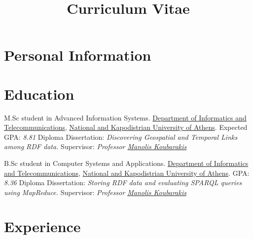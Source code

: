 \documentclass[11pt,a4paper,roman]{moderncv} %
\title{Curriculum Vitae}
\begin{document}
\makecvtitle %




\section{Personal Information}





\section{Education}

{M.Sc student in Advanced Information Systems.}
{\href{http://www.di.uoa.gr/en}{Department of Informatics and Telecommunications}, \href{http://en.uoa.gr}{National and Kapodistrian University of Athens}.}
{Expected GPA: \emph{8.81}}
{Diploma Dissertation: \emph{Discovering Geospatial and Temporal Links among RDF data.}}
{Supervisor: \emph{Professor \href{http://cgi.di.uoa.gr/~koubarak/}{Manolis Koubarakis}}}
{\newline}

{B.Sc student in Computer Systems and Applications.}
{\href{http://www.di.uoa.gr/en}{Department of Informatics and Telecommunications}, \href{http://en.uoa.gr}{National and Kapodistrian University of Athens}.}
{GPA: \emph{8.36}}
{Diploma Dissertation: \emph{Storing RDF data and evaluating SPARQL queries using MapReduce.}}
{Supervisor: \emph{Professor \href{http://cgi.di.uoa.gr/~koubarak/}{Manolis Koubarakis}}}
{}




\section{Experience}
\end{document}
